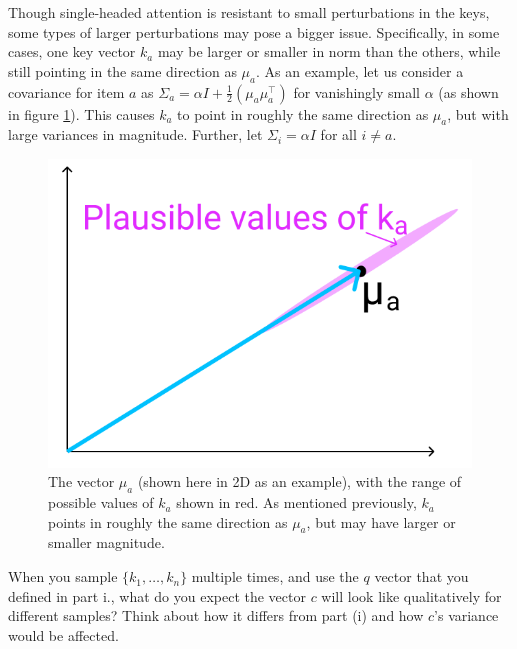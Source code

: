 \begin{parts}
\begin{subparts}
\subpart[3] Though single-headed attention is resistant to small perturbations in the keys, some types of larger perturbations may pose a bigger issue. Specifically, in some cases, one key vector $k_a$ may be larger or smaller in norm than the others, while still pointing in the same direction as $\mu_a$. As an example, let us consider a covariance for item $a$ as $\Sigma_a = \alpha I + \frac{1}{2}(\mu_a\mu_a^\top)$ for vanishingly small $\alpha$ (as shown in figure \ref{ka_plausible}). This causes $k_a$ to point in roughly the same direction as $\mu_a$, but with large variances in magnitude. Further, let $\Sigma_i = \alpha I$ for all $i \neq a$. %
\begin{figure}[h]
\centering
\captionsetup{justification=centering,margin=2cm}
\includegraphics[width=0.35\linewidth]{images/ka_plausible.png}
\caption{The vector $\mu_a$ (shown here in 2D as an example), with the range of possible values of $k_a$ shown in red. As mentioned previously, $k_a$ points in roughly the same direction as $\mu_a$, but may have larger or smaller magnitude.}
\label{ka_plausible}
\end{figure}

When you sample $\{k_1,\dots,k_n\}$ multiple times, and use the $q$ vector that you defined in part i., what do you expect the vector $c$ will look like qualitatively for different samples? Think about how it differs from part (i) and how $c$'s variance would be affected.

\end{subparts}


\end{parts}
